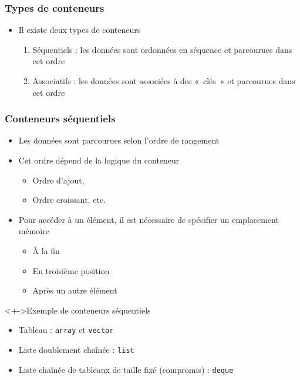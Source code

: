 \begin{frame}
\frametitle{Types de conteneurs}
\begin{itemize}
 \item Il existe deux types de conteneurs
	\begin{enumerate}
	 \item Séquentiels : les données sont ordonnées en séquence et parcourues dans cet ordre
	\onslide<3-> \item Associatifs : les données sont associées à des «~clés~» et parcourues dans cet ordre
	\end{enumerate}
\end{itemize}
\begin{center}
\end{center}
\end{frame}

\begin{frame}
\frametitle{Conteneurs séquentiels}
\begin{itemize}[<+->]
\item Les données sont parcourues selon l'ordre de rangement
\item Cet ordre dépend de la logique du conteneur
	\begin{itemize}
	\item Ordre d'ajout,
	\item Ordre croissant, etc.
	\end{itemize}
\item Pour accéder à un élément, il est nécessaire de spécifier un emplacement mémoire
	\begin{itemize}
	\item À la fin
	\item En troisième position
	\item Après un autre élément
	\end{itemize}
\end{itemize}
\begin{exampleblock}<+->{Exemple de conteneurs séquentiels}
	\begin{itemize}[<+->]
	\item Tableau : \texttt{array} et \texttt{vector}
	\item Liste doublement chaînée : \texttt{list}
	\item Liste chaînée de tableaux de taille fixé (compromis) : \texttt{deque}
	\end{itemize}
\end{exampleblock}
\end{frame}

